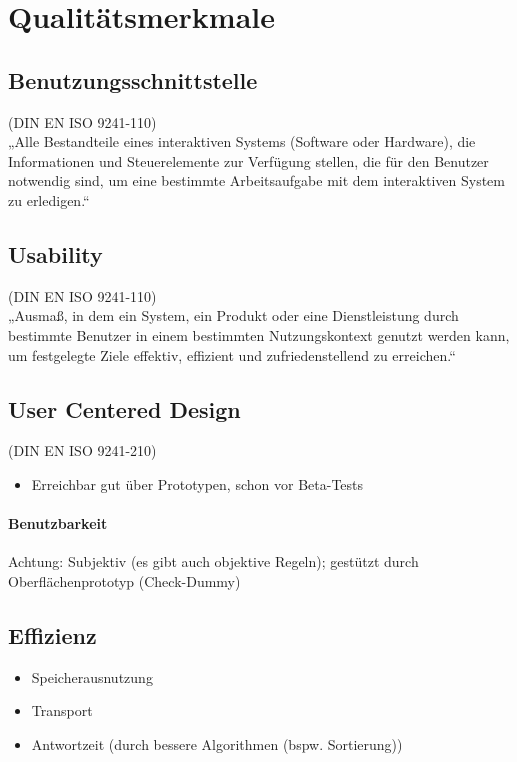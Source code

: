 \section{Qualitätsmerkmale}

\subsection{Benutzungsschnittstelle} (DIN EN ISO 9241-110)\\
„Alle Bestandteile eines interaktiven Systems (Software oder Hardware), 
die Informationen und Steuerelemente zur Verfügung stellen,
die für den Benutzer notwendig sind,
um eine bestimmte Arbeitsaufgabe mit dem interaktiven System zu erledigen.“

\subsection{Usability} (DIN EN ISO 9241-110)\\
„Ausmaß, in dem ein System, ein Produkt oder eine Dienstleistung
durch bestimmte Benutzer in einem bestimmten Nutzungskontext genutzt werden kann,
um festgelegte Ziele effektiv, effizient und zufriedenstellend zu erreichen.“

\subsection{User Centered Design} (DIN EN ISO 9241-210)
\begin{itemize}
\item Erreichbar gut über Prototypen, schon vor Beta-Tests
\end{itemize}
\paragraph{Benutzbarkeit} \parskp
Achtung: Subjektiv (es gibt auch objektive Regeln); gestützt durch Oberflächenprototyp (Check-Dummy)

\subsection{Effizienz} 
\begin{itemize}
\item Speicherausnutzung
\item Transport
\item Antwortzeit (durch bessere Algorithmen (bspw. Sortierung))
\end{itemize}

